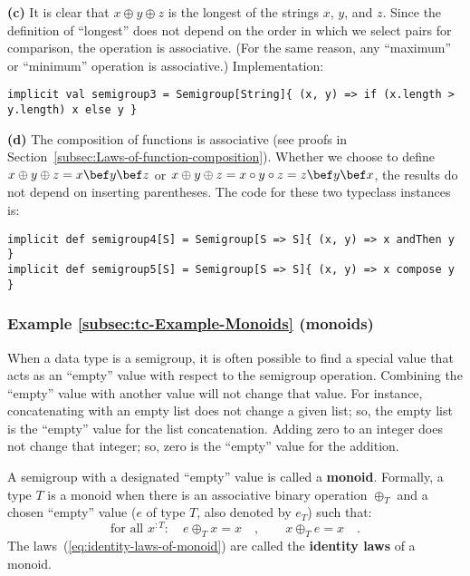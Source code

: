 \textbf{(c)} It is clear that $x\oplus y\oplus z$ is the longest
of the strings $x$, $y$, and $z$. Since the definition of \textsf{``}longest\textsf{''}
does not depend on the order in which we select pairs for comparison,
the operation is associative. (For the same reason, any \textsf{``}maximum\textsf{''}
or \textsf{``}minimum\textsf{''} operation is associative.) Implementation:
\begin{lstlisting}
implicit val semigroup3 = Semigroup[String]{ (x, y) => if (x.length > y.length) x else y }
\end{lstlisting}

\textbf{(d)} The composition of functions is associative (see proofs
in Section~\ref{subsec:Laws-of-function-composition}). Whether we
choose to define $x\oplus y\oplus z=x\bef y\bef z$ or $x\oplus y\oplus z=x\circ y\circ z=z\bef y\bef x$,
the results do not depend on inserting parentheses. The code for these
two typeclass instances is:
\begin{lstlisting}
implicit def semigroup4[S] = Semigroup[S => S]{ (x, y) => x andThen y }
implicit def semigroup5[S] = Semigroup[S => S]{ (x, y) => x compose y }
\end{lstlisting}


\subsubsection{Example \label{subsec:tc-Example-Monoids}\ref{subsec:tc-Example-Monoids}
(monoids)}

When a data type is a semigroup, it is often possible to find a special
value that acts as an \textsf{``}empty\textsf{''} value with respect to the semigroup
operation. Combining the \textsf{``}empty\textsf{''} value with another value will
not change that value. For instance, concatenating with an empty list
does not change a given list; so, the empty list is the \textsf{``}empty\textsf{''}
value for the list concatenation. Adding zero to an integer does not
change that integer; so, zero is the \textsf{``}empty\textsf{''} value for the addition.

A semigroup with a designated \textsf{``}empty\textsf{''} value is called a \textbf{monoid}.
Formally, a type $T$ is a monoid when there is an associative binary
operation $\oplus_{T}$ and a chosen \textsf{``}empty\textsf{''} value ($e$ of type
$T$, also denoted by $e_{T}$) such that: 
\begin{equation}
\text{for all }x^{:T}:\quad e\oplus_{T}x=x\quad,\quad\quad x\oplus_{T}e=x\quad.\label{eq:identity-laws-of-monoid}
\end{equation}
The laws~(\ref{eq:identity-laws-of-monoid}) are called the \textbf{identity
laws} of a monoid. 

